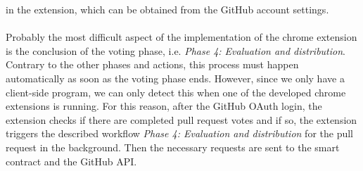 \documentclass[sigconf]{acmart}
\begin{document}
in the extension, which can be obtained from the GitHub account settings. \\ \\
Probably the most difficult aspect of the implementation of the chrome extension is the conclusion of the voting phase, i.e. \textit{Phase 4: 
Evaluation and distribution}. Contrary to the other phases and actions, this process must happen automatically as soon as the 
voting phase ends. However, since we only have a client-side program, we can only detect this when one of the developed 
chrome extensions is running. For this reason, after the GitHub OAuth login, the extension checks if there are completed pull 
request votes and if so, the extension triggers the described workflow \textit{Phase 4: Evaluation and distribution} for the 
pull request in the background. Then the necessary requests are sent to the smart contract and the GitHub API.
\end{document}
